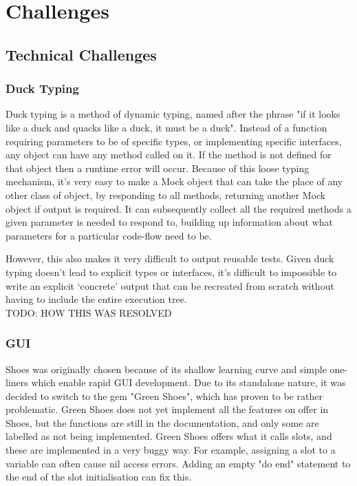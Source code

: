 \chapter{Challenges}
\section{Technical Challenges}
  \subsection{Duck Typing}
    Duck typing is a method of dynamic typing, named after the phrase "if it looks like a duck and quacks like a duck, it must be a duck".
    Instead of a function requiring parameters to be of specific types, or implementing specific interfaces, any object can have any method called on it.
    If the method is not defined for that object then a runtime error will occur.
    Because of this loose typing mechanism, it's very easy to make a Mock object that can take the place of any other class of object, by responding to all methods, returning another Mock object if output is required.
    It can subsequently collect all the required methods a given parameter is needed to respond to, building up information about what parameters for a particular code-flow need to be.

    However, this also makes it very difficult to output reusable tests.
    Given duck typing doesn't lead to explicit types or interfaces, it's difficult to impossible to write an explicit `concrete' output that can be recreated from scratch without having to include the entire execution tree.\\
    TODO: HOW THIS WAS RESOLVED \\

  \subsection{GUI}
    Shoes was originally chosen because of its shallow learning curve and simple one-liners which enable rapid GUI development. Due to its standalone nature, it was decided to switch to the gem "Green Shoes", which has proven to be rather problematic. Green Shoes does not yet implement all the features on offer in Shoes, but the functions are still in the documentation, and only some are labelled as not being implemented. Green Shoes offers what it calls slots, and these are implemented in a very buggy way. For example, assigning a slot to a variable can often cause nil access errors. Adding an empty "do end" statement to the end of the slot initialisation can fix this. 
    
